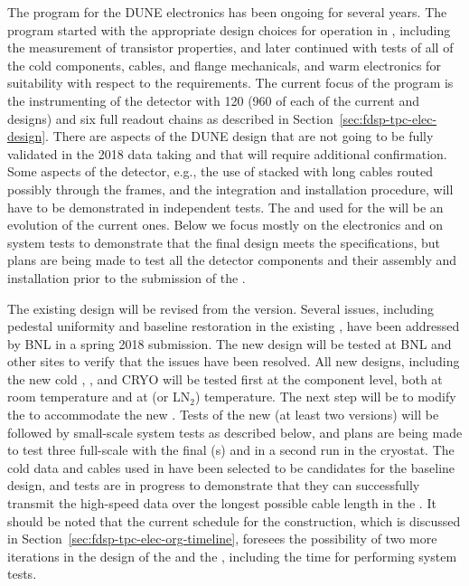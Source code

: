The  program for the DUNE  electronics has been ongoing for several years.  The  program started with the appropriate design choices for operation
in \lar, including the measurement of transistor properties, and later
continued with tests of all of the cold components, cables, \fdth and flange mechanicals, and warm electronics for suitability 
with respect to the  requirements.  The current focus of the  program is the instrumenting of the  detector with \num{120}  (\num{960} of each of the current  and   designs) and six full  readout chains as described in Section~\ref{sec:fdsp-tpc-elec-design}. There are aspects of the DUNE design that are not going to be fully validated in the 2018  data taking and that will require additional confirmation. Some aspects of the detector, e.g., the use of stacked  with long cables routed possibly through the  frames, and the integration and installation procedure, will have to be demonstrated in independent tests. The  and  used for the  will be an evolution of the current  ones. Below we focus mostly on the electronics and on system tests to demonstrate that the final design meets the  specifications, but plans are being made to test all the detector components and their assembly and installation prior to the submission of the .

The existing  design will be revised from the  version. Several issues, 
including pedestal uniformity and baseline restoration in the existing , have been 
addressed by BNL in a spring 2018 submission. The new design will be tested at BNL and other sites to 
verify that the issues have been resolved. All new  designs, including the new cold , , and CRYO will be tested first at the component level, both at room temperature and at \lar (or LN$_2$) temperature. The next step will be to modify the  to accommodate the new .  Tests of the new  (at least two versions) will be followed by small-scale system tests as described below, and plans are being made to test three full-scale  with the final (s) and  in a second run in the  cryostat.  The cold data and  cables used in  have been selected to be candidates for the  baseline design, and tests are in progress to demonstrate that they can successfully transmit the high-speed data over the longest possible cable length in the . It should be noted that the current schedule for the  construction, which is discussed in Section~\ref{sec:fdsp-tpc-elec-org-timeline}, foresees the possibility of two more iterations in the design of the  and the , including the time for performing system tests.

